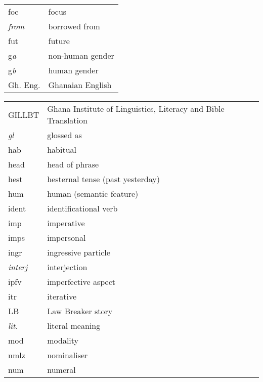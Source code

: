 \begin{tabular}{ll}
 {\sc foc} & focus \\
  {\it from} & borrowed from \\
{\sc fut} &  future\\


{\sc g}{\it a} & non-human gender  \\
{\sc g}{\it b} &  human gender\\
Gh. Eng. & Ghanaian English\\
\end{tabular}

 \begin{tabular}{ll}
GILLBT & Ghana Institute of Linguistics, Literacy and Bible Translation\\

{\it gl} & glossed as\\

{\sc hab} & habitual \\ %
{\sc head} & head of phrase \\ %
 {\sc hest} & hesternal tense (past yesterday) \\
 {\sc hum} & human   (semantic feature)\\

{\sc ident} & identificational verb\\ %
{\sc imp} & imperative\\ %
{\sc imps} & impersonal\\ %
{\sc ingr} & ingressive particle\\
{\it interj} & interjection\\ %
{\sc ipfv} &  imperfective aspect\\%
{\sc itr} & iterative\\ %

LB  & Law Breaker story\\
{\it lit.} & literal meaning\\

 {\sc mod} &  modality \\

{\sc nmlz} &  nominaliser\\ %
{\sc num} &  numeral\\ %


\end{tabular}
